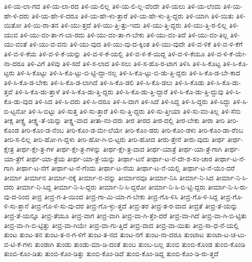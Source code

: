 {ತಿಳಿ-ಯ-ಲಾ-ಗದ
ತಿಳಿ-ಯ-ಲಾ-ರದ
ತಿಳಿ-ಯ-ಲಿಲ್ಲ
ತಿಳಿ-ಯ-ಲಿ-ಲ್ಲ-ವೆಂದೇ
ತಿಳಿ-ಯಲು
ತಿಳಿ-ಯ-ಲೆಂದು
ತಿಳಿ-ಯ-ಹೇ-ಳಿ-ದರು
ತಿಳಿ-ಯ-ಹೇ-ಳಿ-ದರೂ
ತಿಳಿ-ಯ-ಹೇ-ಳು-ತ್ತಾರೆ
ತಿಳಿ-ಯ-ಹೇ-ಳು-ತ್ತಿ-ದ್ದರು
ತಿಳಿ-ಯಾಗಿ
ತಿಳಿ-ಯಿತು
ತಿಳಿ-ಯಿತೋ
ತಿಳಿ-ಯಿ-ರಾ-ತನ
ತಿಳಿ-ಯು-ತ್ತದೆ
ತಿಳಿ-ಯು-ತ್ತಿ-ತ್ತು-ಇದು
ತಿಳಿ-ಯು-ತ್ತಿ-ದ್ದರು
ತಿಳಿ-ಯು-ತ್ತಿ-ರ-ಲಿಲ್ಲ
ತಿಳಿ-ಯುವ
ತಿಳಿ-ಯು-ವಂ-ತಾ-ಗ-ಬಾ-ರದು
ತಿಳಿ-ಯು-ವಂ-ತಾ-ಗ-ಬೇಕು
ತಿಳಿ-ಯು-ವಂ-ತಿದೆ
ತಿಳಿ-ಯು-ವಂ-ತಿಲ್ಲ
ತಿಳಿ-ಯು-ವಂತೆ
ತಿಳಿ-ಯು-ವ-ವನು
ತಿಳಿ-ಯು-ವುದ
ತಿಳಿ-ಯು-ವು-ದ-ಕ್ಕಿಂತ
ತಿಳಿ-ಯು-ವುದೇ
ತಿಳಿ-ವ-ಳಿಕೆ
ತಿಳಿ-ವ-ಳಿ-ಕೆಗೆ
ತಿಳಿ-ವ-ಳಿ-ಕೆಯ
ತಿಳಿ-ವ-ಳಿ-ಕೆ-ಯನ್ನು
ತಿಳಿ-ವ-ಳಿ-ಕೆ-ಯಲ್ಲಿ
ತಿಳಿ-ವ-ಳಿ-ಕೆ-ಯಿದ್ದ
ತಿಳಿ-ವ-ಳಿ-ಕೆಯೂ
ತಿಳಿ-ವ-ಳಿ-ಕೆ-ಯೇ-ನಾ-ದರೂ
ತಿಳಿ-ವಿಗೆ
ತಿಳಿವು
ತಿಳಿ-ಸದೆ
ತಿಳಿ-ಸ-ಲಾದ
ತಿಳಿ-ಸಲು
ತಿಳಿ-ಸ-ಹೊ-ರ-ಟಾಗ
ತಿಳಿಸಿ
ತಿಳಿ-ಸಿ-ಕೊಟ್ಟ
ತಿಳಿ-ಸಿ-ಕೊ-ಟ್ಟರು
ತಿಳಿ-ಸಿ-ಕೊಟ್ಟು
ತಿಳಿ-ಸಿ-ಕೊ-ಟ್ಟು-ಬಿ-ಟ್ಟಿ-ದ್ದಾ-ನಲ್ಲ
ತಿಳಿ-ಸಿ-ಕೊ-ಟ್ಟು-ಬಿ-ಡು-ತ್ತಿ-ದ್ದರು
ತಿಳಿ-ಸಿ-ಕೊ-ಡ-ಬೇ-ಕಾದ
ತಿಳಿ-ಸಿ-ಕೊ-ಡ-ಬೇಕು
ತಿಳಿ-ಸಿ-ಕೊ-ಡ-ಲಾಗಿದೆ
ತಿಳಿ-ಸಿ-ಕೊ-ಡಲಿ
ತಿಳಿ-ಸಿ-ಕೊ-ಡಲು
ತಿಳಿ-ಸಿ-ಕೊಡು
ತಿಳಿ-ಸಿ-ಕೊ-ಡು-ತ್ತವೆ
ತಿಳಿ-ಸಿ-ಕೊ-ಡು-ತ್ತಾಳೆ
ತಿಳಿ-ಸಿ-ಕೊ-ಡು-ತ್ತಿ-ದ್ದರು
ತಿಳಿ-ಸಿ-ಕೊ-ಡು-ತ್ತಿ-ದ್ದಾರೆ
ತಿಳಿ-ಸಿ-ಕೊ-ಡು-ತ್ತಿ-ದ್ದುವು
ತಿಳಿ-ಸಿ-ಕೊ-ಡು-ವುದ
ತಿಳಿ-ಸಿದ
ತಿಳಿ-ಸಿ-ದರು
ತಿಳಿ-ಸಿ-ದರೂ
ತಿಳಿ-ಸಿ-ದಾಗ
ತಿಳಿ-ಸಿದೆ
ತಿಳಿ-ಸಿದ್ದ
ತಿಳಿ-ಸಿ-ದ್ದರು
ತಿಳಿ-ಸಿದ್ದು
ತಿಳಿ-ಸಿ-ಬಿ-ಟ್ಟನೋ
ತಿಳಿ-ಸಿ-ಬಿಟ್ಟು
ತಿಳಿ-ಸುತ್ತ
ತಿಳಿ-ಸು-ತ್ತಾರೆ
ತಿಳಿ-ಸು-ತ್ತಿ-ದ್ದರು
ತಿಳಿ-ಸು-ತ್ತೀಯಾ
ತಿಳಿ-ಸು-ವಂ-ತಿಲ್ಲ
ತಿಳಿ-ಸೆನು
ತೀಕ್ಷ
ತೀಕ್ಷ್ಣ
ತೀಕ್ಷ್ಣ-ತೆ-ಯನ್ನು
ತೀಕ್ಷ್ಣ-ವಾದ
ತೀತಾ-ನಂ-ದರು
ತೀರ
ತೀರದ
ತೀರ-ದಲ್ಲಿ
ತೀರ-ಬೇಕು
ತೀರಾ
ತೀರಿ
ತೀರಿ-ಕೊಂಡ
ತೀರಿ-ಕೊಂ-ಡ-ನೆಂಬ
ತೀರಿ-ಕೊಂ-ಡ-ಮೇ-ಲೆಯೇ
ತೀರಿ-ಕೊಂ-ಡರು
ತೀರಿ-ಕೊಂ-ಡಳು
ತೀರಿ-ಕೊಂ-ಡಾ-ರೆಂಬ
ತೀರಿ-ಸ-ಲಿಲ್ಲ
ತೀರಿ-ಹೋ-ಗಿ-ದ್ದಳು
ತೀರಿ-ಹೋ-ಗಿ-ಬಿ-ಟ್ಟರು
ತೀರಿ-ಹೋದ
ತೀರು-ತ್ತೇನೆ
ತೀರು-ವುದು
ತೀರ್ಥ
ತೀರ್ಥ-ಕ್ಷೇತ್ರ
ತೀರ್ಥ-ಕ್ಷೇ-ತ್ರ-ಗಳ
ತೀರ್ಥ-ಕ್ಷೇ-ತ್ರ-ಗಳನ್ನು
ತೀರ್ಥ-ಕ್ಷೇ-ತ್ರ-ವಾದ
ತೀರ್ಥ-ಯಾತ್ರೆ
ತೀರ್ಥ-ಯಾ-ತ್ರೆ-ಗಾಗಿ
ತೀರ್ಥ-ಯಾ-ತ್ರೆಗೆ
ತೀರ್ಥ-ಯಾ-ತ್ರೆಯ
ತೀರ್ಥ-ಯಾ-ತ್ರೆ-ಯನ್ನು
ತೀರ್ಥಾ-ಟನೆ
ತೀರ್ಥಾ-ಟ-ನೆ-ದೇ-ಶ-ಸಂ-ಚಾರ
ತೀರ್ಥಾ-ಟ-ನೆ-ಗಾಗಿ
ತೀರ್ಥಾ-ಟ-ನೆಗೆ
ತೀರ್ಥಾ-ಟ-ನೆ-ಗೆಂದು
ತೀರ್ಥಾ-ಟ-ನೆಯ
ತೀರ್ಥಾ-ಟ-ನೆ-ಯಲ್ಲಿ
ತೀರ್ಥಾ-ಟ-ನೆ-ಯೆಂ-ದರೆ
ತೀರ್ಮಾ
ತೀರ್ಮಾನ
ತೀರ್ಮಾ-ನಕ್ಕೆ
ತೀರ್ಮಾ-ನ-ವನ್ನು
ತೀರ್ಮಾನವೂ
ತೀರ್ಮಾ-ನಿಸಿ
ತೀರ್ಮಾ-ನಿ-ಸಿದ
ತೀರ್ಮಾ-ನಿ-ಸಿ-ದರು
ತೀರ್ಮಾ-ನಿ-ಸಿದ್ದ
ತೀರ್ಮಾ-ನಿ-ಸಿ-ದ್ದರು
ತೀರ್ಮಾ-ನಿ-ಸಿ-ದ್ದರೋ
ತೀರ್ಮಾ-ನಿ-ಸಿ-ಬಿ-ಟ್ಟಿ-ದ್ದರು
ತೀರ್ಮಾ-ನಿ-ಸಿ-ರು-ವು-ದ-ರಿಂದ
ತೀವ್ರ
ತೀವ್ರ-ಗ-ತಿ-ಯಿಂದ
ತೀವ್ರ-ಗಾ-ಮಿ-ಯಾ-ಗ-ಬೇಕು
ತೀವ್ರ-ಗೊ-ಳಿಸಿ
ತೀವ್ರ-ಗೊ-ಳಿ-ಸಿದ್ದ
ತೀವ್ರ-ಗೊ-ಳಿ-ಸು-ತ್ತಾನೆ
ತೀವ್ರ-ಗೊ-ಳಿ-ಸು-ವು-ದರ
ತೀವ್ರ-ಗೊ-ಳ್ಳು-ತ್ತದೆ
ತೀವ್ರ-ತರ
ತೀವ್ರ-ತ-ರ-ವಾದ
ತೀವ್ರತೆ
ತೀವ್ರ-ತೆ-ಯನ್ನು
ತೀವ್ರ-ತೆ-ಯನ್ನೂ
ತೀವ್ರ-ತೆಯೂ
ತೀವ್ರ-ವಾಗ
ತೀವ್ರ-ವಾಗಿ
ತೀವ್ರ-ವಾ-ಗಿ-ತ್ತೆಂ-ದರೆ
ತೀವ್ರ-ವಾ-ಗಿದೆ
ತೀವ್ರ-ವಾ-ಗಿ-ಬಿ-ಟ್ಟಿತು
ತೀವ್ರ-ವಾ-ಗಿ-ಬಿ-ಟ್ಟಿತ್ತು
ತೀವ್ರ-ವಾ-ಗಿಯೇ
ತೀವ್ರ-ವಾ-ಗು-ತ್ತಿದೆ
ತೀವ್ರ-ವಾದ
ತೀವ್ರ-ವಾ-ಯಿತು
ತೀವ್ರ-ಸಾ-ಧ-ನೆ-ಯಲ್ಲಿ
ತುಂಟ
ತುಂಟ-ತನ
ತುಂಟ-ತ-ನ-ಗ-ಳಿಗೆ
ತುಂಟ-ತ-ನದ
ತುಂಟ-ನಗೆ
ತುಂಟ-ನಾ-ದರೂ
ತುಂಟಾಟ
ತುಂಟಾ-ಟ-ಚ-ಟು-ವ-ಟಿ-ಕೆ-ಗಳು
ತುಂಡಾಗಿ
ತುಂಡು
ತುಂಡು-ಮಾ-ಡಿ-ದಂತೆ
ತುಂಬ
ತುಂಬ-ಬಲ್ಲ
ತುಂಬಿ
ತುಂಬಿ-ಕೊಂಡ
ತುಂಬಿ-ಕೊಂಡಿ
ತುಂಬಿ-ಕೊಂ-ಡಿತು
ತುಂಬಿ-ಕೊಂ-ಡಿತ್ತು
ತುಂಬಿ-ಕೊಂ-ಡಿದೆ
ತುಂಬಿ-ಕೊಂ-ಡಿದ್ದ
ತುಂಬಿ-ಕೊಂ-ಡಿ-ರು-ತ್ತದೆ
}
